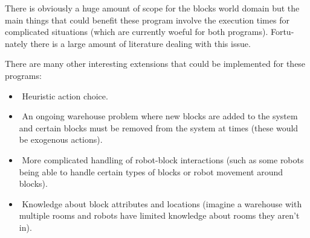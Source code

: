 \documentclass{article}
\begin{document}
There is obviously a huge amount of scope for the blocks world domain but the
main things that could benefit these program involve the execution times for
complicated situations (which are currently woeful for both programs). Fortu-
nately there is a large amount of literature dealing with this issue.

There are many other interesting extensions that could be implemented for
these programs:
\begin{itemize}
	\item Heuristic action choice.
	\item An ongoing warehouse problem where new blocks are added to the system
and certain blocks must be removed from the system at times (these would
be exogenous actions).
	\item More complicated handling of robot-block interactions (such as some robots
being able to handle certain types of blocks or robot movement around
blocks).
	\item Knowledge about block attributes and locations (imagine a warehouse
with multiple rooms and robots have limited knowledge about rooms they
aren't in).
\end{itemize}
\end{document}
